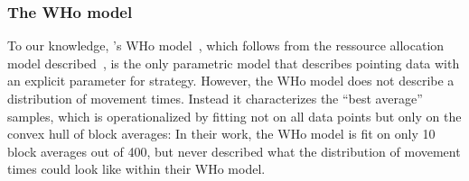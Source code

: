 \documentclass[acmlarge, manuscript,review]{acmart}
\begin{document}
\subsubsection{The WHo model\label{subsub:who}}
To our knowledge, \citeauthor{guiard2015}'s WHo model~\cite{guiard2015}, which follows from the ressource allocation model described~\cite{guiard2011b}, is the only parametric model that describes pointing data with an explicit parameter for strategy.
However, the WHo model does not describe a distribution of movement times. Instead it characterizes the ``best average'' samples, %
which is operationalized by fitting not on all data points but only on the convex hull of block averages: In their work, the WHo model is fit on only 10 block averages out of 400, but \citeauthor{guiard2015} never described what the distribution of movement times could look like within their WHo model.
\end{document}
